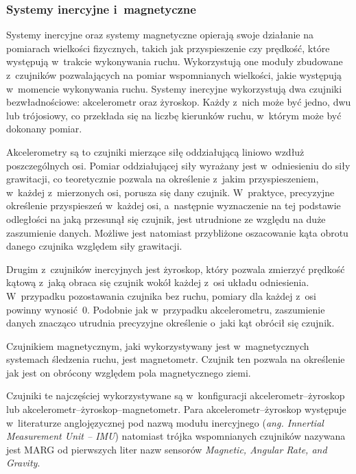 \subsubsection*{Systemy inercyjne i~magnetyczne}\label{chap:mocaps:IMU}
Systemy inercyjne oraz systemy magnetyczne opierają swoje działanie na pomiarach wielkości fizycznych, takich jak przyspieszenie czy prędkość, które występują w~trakcie wykonywania ruchu. Wykorzystują one moduły zbudowane z~czujników pozwalających na pomiar wspomnianych wielkości, jakie występują w~momencie wykonywania ruchu. Systemy inercyjne wykorzystują dwa czujniki bezwładnościowe: akcelerometr oraz żyroskop. Każdy z~nich może być jedno, dwu lub trójosiowy, co przekłada się na liczbę kierunków ruchu, w~którym może być dokonany pomiar.

Akcelerometry są to czujniki mierzące siłę oddziałującą liniowo wzdłuż poszczególnych osi. Pomiar oddziałującej siły wyrażany jest w~odniesieniu do siły grawitacji, co teoretycznie pozwala na określenie z~jakim przyspieszeniem, w~każdej z~mierzonych osi, porusza się dany czujnik. W~praktyce, precyzyjne określenie przyspieszeń w~każdej osi, a~następnie wyznaczenie na tej podstawie odległości na jaką przesunął się czujnik, jest utrudnione ze względu na duże zaszumienie danych. Możliwe jest natomiast przybliżone oszacowanie kąta obrotu danego czujnika względem siły grawitacji.

Drugim z~czujników inercyjnych jest żyroskop, który pozwala zmierzyć prędkość kątową z~jaką obraca się czujnik wokół każdej z~osi układu odniesienia. W~przypadku pozostawania czujnika bez ruchu, pomiary dla każdej z~osi powinny wynosić~0. Podobnie jak w~przypadku akcelerometru, zaszumienie danych znacząco utrudnia precyzyjne określenie o~jaki kąt obrócił się czujnik.

Czujnikiem magnetycznym, jaki wykorzystywany jest w~magnetycznych systemach śledzenia ruchu, jest magnetometr. Czujnik ten pozwala na określenie jak jest on obrócony względem pola magnetycznego ziemi.

Czujniki te najczęściej wykorzystywane są w~konfiguracji akcelerometr--żyroskop lub akcelerometr--żyroskop--magnetometr. Para akcelerometr--żyroskop występuje w~literaturze anglojęzycznej pod nazwą modułu inercyjnego (\emph{ang. Innertial Measurement Unit -- IMU}) natomiast trójka wspomnianych czujników nazywana jest MARG od pierwszych liter nazw sensorów \emph{Magnetic, Angular Rate, and Gravity}.

